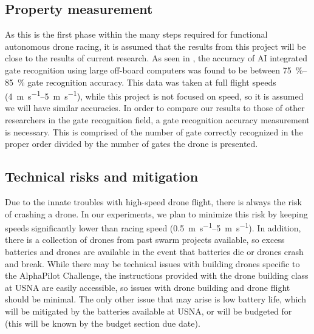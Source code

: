 \documentclass[onecolumn,10pt]{IEEEtran}
\begin{document}
\subsection{Property measurement}
As this is the first phase within the many steps required for functional autonomous drone racing, it is assumed that the results from this project will be close to the results of current research. As seen in \cite{jung2018perception}, the accuracy of AI integrated gate recognition using large off-board computers was found to be between \SIrange{75}{85}{\percent} gate recognition accuracy. This data was taken at full flight speeds (\SIrange{4}{5}{\meter\per\second}), while this project is not focused on speed, so it is assumed we will have similar accuracies. In order to compare our results to those of other researchers in the gate recognition field, a gate recognition accuracy measurement is necessary. This is comprised of the number of gate correctly recognized in the proper order divided by the number of gates the drone is presented.

\subsection{Technical risks and mitigation}
Due to the innate troubles with high-speed drone flight, there is always the risk of crashing a drone. In our experiments, we plan to minimize this risk by keeping speeds significantly lower than racing speed (\SIrange{0.5}{5}{\meter\per\second}). In addition, there is a collection of drones from past swarm projects available, so excess batteries and drones are available in the event that batteries die or drones crash and break. While there may be technical issues with building drones specific to the AlphaPilot Challenge, the instructions provided with the drone building class at USNA are easily accessible, so issues with drone building and drone flight should be minimal. The only other issue that may arise is low battery life, which will be mitigated by the batteries available at USNA, or will be budgeted for (this will be known by the budget section due date).

\end{document}
